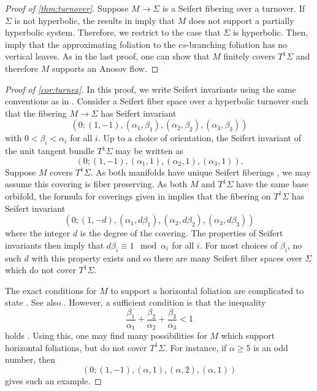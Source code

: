 \documentclass[11pt]{amsart} %
\newcommand{\Sig}{\Sigma}
\newcommand{\al}{\alpha}
\newcommand{\bt}{\beta}
\numberwithin{equation}{section}
\theoremstyle{remark}
\begin{document}
\begin{proof}[Proof of \cref{thm:turnover}]
    Suppose $M  \to  \Sig$ is a Seifert fibering over a turnover.
    If $\Sig$ is not hyperbolic, the results in
    \cite[Appendix A]{HPSol}
    imply that $M$ does not support a partially hyperbolic system.
    Therefore, we restrict to the case that $\Sig$ is hyperbolic.
    Then, \cite[Corollary 4 and Proposition 6]{Brittenham}
    imply that the approximating foliation to the $cs$-branching foliation
    has no vertical leaves.
    As in the last proof,
    one can show that $M$ finitely covers $T^1 \Sig$
    and therefore $M$ supports an Anosov flow.
\end{proof}
\begin{proof}[Proof of \cref{cor:turnex}]
    In this proof, we write Seifert invariants using the same conventions as in
    \cite{jn1983lectures}.
    Consider a Seifert fiber space over a hyperbolic turnover
    such that the fibering $M  \to  \Sig$ has
    Seifert invariant
    \[
        (0; (1,-1), (\al_1, \bt_1), (\al_2, \bt_2), (\al_3, \bt_3))
    \]
    with $0 < \bt_i < \al_i$ for all $i$.
    Up to a choice of orientation,
    the Seifert invariant of the unit tangent bundle $T^1 \Sig$
    may be written as
    \[
        (0; (1,-1), (\al_1, 1), (\al_2, 1), (\al_3, 1)).
    \]
    Suppose $M$ covers $T^1 \Sig$.
    As both manifolds have unique Seifert fiberings
    \cite[Theorem 5.2]{jn1983lectures},
    we may assume this covering is fiber preserving.
    As both $M$ and $T^1 \Sig$ have the same base orbifold,
    the formula for coverings given in
    \cite[Proposition 2.5]{jn1983lectures} implies that
    the fibering on $T^1 \Sig$ has Seifert invariant
    \[
        (0; (1,-d), (\al_1, d \bt_1), (\al_2, d \bt_2), (\al_3, d \bt_3))
    \]
    where the integer $d$ is the degree of the covering.
    The properties of Seifert invariants then imply that
    $d \bt_i \equiv 1 \mod \al_i$ for all $i$.
    For most choices of $\bt_i$, no such $d$ with this property exists
    and so there are many Seifert fiber spaces over $\Sig$
    which do not cover $T^1 \Sig$.

    The exact conditions for $M$ to support a horizontal foliation are
    complicated to state \cite{nai1994foliations}.
    See also \cite[Section 4.11]{Calegari}. %
    However, a sufficient condition is that the inequality
    \[ 
         \frac{\bt_1}{\al_1} +
         \frac{\bt_2}{\al_2} +
         \frac{\bt_3}{\al_3} < 1
           \]
    holds \cite[Equation 5.2 and Proposition 5.3]{ehn1981transverse}.
    Using this, one may find many possibilities for $M$
    which support horizontal foliations,
    but do not cover $T^1 \Sig$.
    For instance, if $\al  \ge  5$ is an odd number, then
    \[
        (0; (1,-1), (\al, 1), (\al, 2), (\al, 1))
    \]
    gives such an example.
\end{proof}
\end{document}
